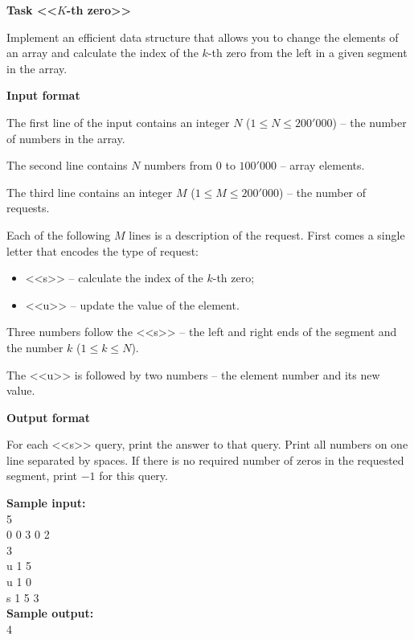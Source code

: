 \documentclass[a4paper]{article}
\begin{document}
\textbf{Task <<$K$-th zero>>}

Implement an efficient data structure that allows you to change the elements of an array and calculate the index of the $k$-th zero from the left in a given segment in the array.

\SPACE

\textbf{Input format}

The first line of the input contains an integer $N$ ($1 \le N \le 200'000$) -- the number of numbers in the array.

The second line contains $N$ numbers from $0$ to $100'000$ -- array elements.

The third line contains an integer $M$ ($1 \le M \le 200'000$) -- the number of requests.

Each of the following $M$ lines is a description of the request. First comes a single letter that encodes the type of request:
\begin{itemize}
\item <<s>> -- calculate the index of the $k$-th zero;
\item <<u>> -- update the value of the element.
\end{itemize}

Three numbers follow the <<s>> -- the left and right ends of the segment and the number $k$ ($1 \le k \le N$).

The <<u>> is followed by two numbers -- the element number and its new value.

\SPACE

\textbf{Output format}

For each <<s>> query, print the answer to that query. Print all numbers on one line separated by spaces. If there is no required number of zeros in the requested segment, print $-1$ for this query.

\LINE

\noindent \textbf{Sample input:}\\
5\\
0 0 3 0 2\\
3\\
u 1 5\\
u 1 0\\
s 1 5 3\\

\noindent \textbf{Sample output:}\\
4\\
\end{document}
